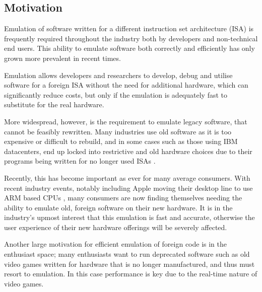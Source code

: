 \subsection{Motivation}

Emulation of software written for a different instruction set architecture (ISA) is frequently required throughout the industry both by developers and non-technical end users. This ability to emulate software both correctly and efficiently has only grown more prevalent in recent times.  

Emulation allows developers and researchers to develop, debug and utilise software for a foreign ISA without the need for additional hardware, which can significantly reduce costs, but only if the emulation is adequately fast to substitute for the real hardware.

More widespread, however, is the requirement to emulate legacy software, that cannot be feasibly rewritten. Many industries use old software as it is too expensive or difficult to rebuild, and in some cases such as those using IBM datacenters, end up locked into restrictive and old hardware choices due to their programs being written for no longer used ISAs . 

Recently, this has become important as ever for many average consumers. With recent industry events, notably including Apple moving their desktop line to use ARM based CPUs , many consumers are now finding themselves needing the ability to emulate old, foreign software on their new hardware. It is in the industry's upmost  interest that this emulation is fast and accurate, otherwise the user experience of their new hardware offerings will be severely affected.

Another large motivation for efficient emulation of foreign code is in the enthusiast space; many enthusiasts want to run deprecated software such as old video games written for hardware that is no longer manufactured, and thus must resort to emulation.  In this case performance is key due to the real-time nature of video games.

